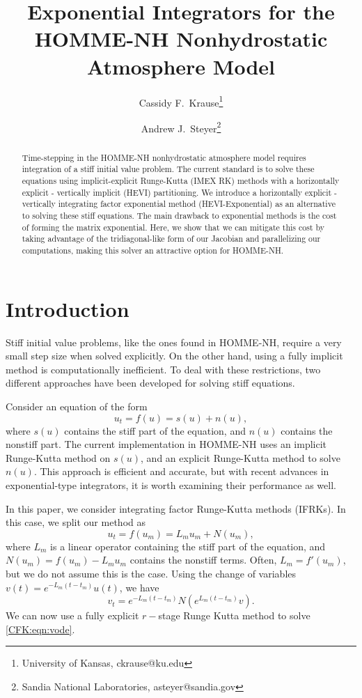 \documentclass{csri19}
\title{Exponential Integrators for the HOMME-NH Nonhydrostatic Atmosphere
 Model}
\author{Cassidy F.\ Krause\thanks{University of Kansas, ckrause@ku.edu}
\and Andrew J.\ Steyer\thanks{Sandia National Laboratories, asteyer@sandia.gov}}
\begin{document}
\maketitle

\begin{abstract}
Time-stepping in the HOMME-NH nonhydrostatic atmosphere model requires 
integration of a stiff initial value problem. The current standard is to
 solve these equations using implicit-explicit Runge-Kutta (IMEX RK) 
methods with a horizontally explicit - vertically implicit (HEVI) 
partitioning. We introduce a horizontally explicit - vertically integrating
 factor exponential method (HEVI-Exponential) as an alternative to solving 
these stiff equations. The main drawback to exponential methods is the cost
 of forming the matrix exponential. Here, we show that we can mitigate this 
cost by taking advantage of the tridiagonal-like form of our Jacobian and 
parallelizing our computations, making this solver an attractive option for
HOMME-NH.
\end{abstract}

\section{Introduction} \label{CFK:sec:intro}
Stiff initial value problems, like the ones found in HOMME-NH, require a 
very small step size when solved explicitly. On the other hand, using a 
fully implicit method is computationally inefficient. To deal with these 
restrictions, two different approaches have been developed for solving 
stiff equations.

Consider an equation of the form \[ u_t = f(u) = s(u) + n(u),\] where $s(u)$ 
contains the stiff part of the equation, and $n(u)$ contains the nonstiff 
part. The current implementation in HOMME-NH uses an implicit Runge-Kutta
method on $s(u)$, and an explicit Runge-Kutta method to solve $n(u)$. This 
approach is efficient and accurate, but with recent advances in 
exponential-type integrators, it is worth examining their performance as 
well.

In this paper, we consider integrating factor Runge-Kutta methods (IFRKs). 
In this case, we split our method as \[ u_t = f(u_m) = L_mu_m + N(u_m),\] 
where $L_m$ is a linear operator containing the stiff part of the equation, 
and $N(u_m) = f(u_m)-L_mu_m$ contains the nonstiff terms. Often, 
$L_m = f'(u_m)$, but we do not assume this is the case. Using the change of
 variables $v(t) = e^{-L_m(t-t_m)}u(t)$, we have
\begin{equation}\label{CFK:eqn:vode}
v_t = e^{-L_m(t-t_m)}N(e^{L_m(t-t_m)}v).
\end{equation} 
We can now use a fully explicit $r-$stage Runge Kutta method to solve 
\ref{CFK:eqn:vode}.
\end{document}
